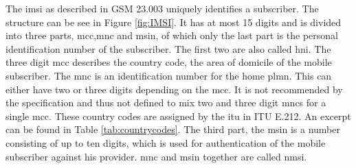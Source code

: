 The \gls{imsi} as described in GSM 23.003\cite{GSM23003} uniquely identifies a subscriber.
The structure can be see in Figure \ref{fig:IMSI}.
It has at most 15 digits and is divided into three parts, \gls{mcc},\gls{mnc} and \gls{msin}, of which only the last part is the personal identification number of the subscriber.
The first two are also called \gls{hni}.
The three digit \gls{mcc} describes the country code, the area of domicile of the mobile subscriber.
The \gls{mnc} is an identification number for the home \gls{plmn}.
This can either have two or three digits depending on the \gls{mcc}.
It is not recommended by the specification and thus not defined to mix two and three digit \gls{mnc}s for a single \gls{mcc}.
These country codes are assigned by the \gls{itu} in ITU E.212\cite{ITU212}.
An excerpt can be found in Table \ref{tab:countrycodes}.
The third part, the \gls{msin} is a number consisting of up to ten digits, which is used for authentication of the mobile subscriber against his provider.
\gls{mnc} and \gls{msin} together are called \gls{nmsi}.
\begin{table}
\centering
{}
\hspace{.5cm}
\caption{Mobile Country and Network Codes. (R) denotes that the MCC is reserved but not operational as of yet, whereas (T) denotes a operational test network.}
\label{tab:countrycodes}
\end{table}

